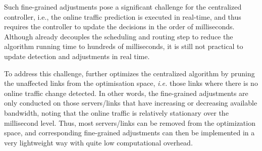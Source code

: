 {
Such fine-grained adjustments pose a significant challenge for the centralized controller, i.e., the online traffic prediction is executed in real-time, and thus requires the controller to update the decisions in the order of milliseconds. Although \name already decouples the scheduling and routing step to reduce the algorithm running time to hundreds of milliseconds, it is still not practical to update detection and adjustments in real time.

To address this challenge, \newname further optimizes the centralized algorithm by pruning the unaffected links from the optimisation space, \emph{i.e.} those links where there is no online traffic change detected. In other words, the fine-grained adjustments are only conducted on those servers/links that have increasing or decreasing available bandwidth, noting that the online traffic is relatively stationary over the millisecond level. Thus, most servers/links can be removed from the optimization space, and corresponding fine-grained adjustments can then be implemented in a very lightweight way with quite low computational overhead.

}
